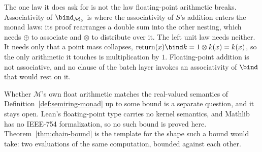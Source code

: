 The one law it does ask for is not the law floating-point arithmetic
breaks. Associativity of $\bind_{\MS S}$ is where the associativity of
$S$'s addition enters the monad laws: its proof rearranges a double sum
into the other nesting, which needs $\oplus$ to associate and
$\otimes$ to distribute over it. The left unit law needs neither. It
needs only that a point mass collapses, $\Ret(x) \bind k = 1 \otimes
k(x) = k(x)$, so the only arithmetic it touches is multiplication by
$1$.
Floating-point addition is not associative, and no clause of the batch
layer invokes an associativity of $\bind$ that would rest on it.

Whether $\mathcal M$'s own float arithmetic matches the real-valued
semantics of Definition~\ref{def:semiring-monad} up to some bound is a
separate question, and it stays open. Lean's floating-point type
carries no kernel semantics, and Mathlib has no IEEE-754
formalization, so no such bound is proved here.
Theorem~\ref{thm:chain-bound} is the template for the shape such a
bound would take: two evaluations of the same computation, bounded
against each other.

